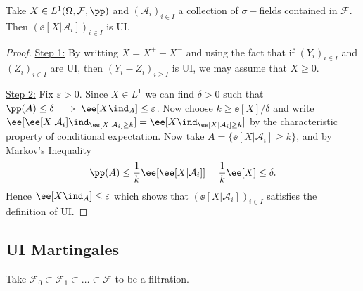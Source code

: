 \documentclass[../main.tex]{subfiles}
\begin{document}
  \begin{proposition}
    Take $X \in L^1(\Omega, \mathcal{F}, \pp)$ and $(\mathcal{A}_i)_{i \in I}$
    a collection of $\sigma-$fields contained in $\mathcal{F}$.
    Then $(\ee[X | \mathcal{A}_i])_{i \in I}$ is UI. 
  \end{proposition}
  \begin{proof}
    \underline{Step 1:} By writting $X = X^+ - X^-$ and using the fact that if
    $(Y_{i})_{i \in I}$ and $(Z_i)_{i \in I}$ are UI, then $(Y_i - Z_i)_{i \geq
    I}$ is UI, we may assume that $X \geq 0$.

    \vspace{0.3em}
    \noindent
    \underline{Step 2:}
    Fix $\varepsilon>0$. Since $X \in L^1$ we can find $\delta > 0$ such that
    $\pp(A) \leq \delta \implies \ee[X \ind_A] \leq \varepsilon$. Now choose $k
    \geq \ee[X] / \delta$ and write
    $\ee[\ee[X | \mathcal{A}_i] \ind_{\ee[X | \mathcal{A}_i] \geq k}] = \ee[X
    \ind_{\ee[X|\mathcal{A}_i] \geq k}]$ by the characteristic property of
    conditional expectation. Now take $A = \{ \ee[X | \mathcal{A}_i] \geq k\} $,
    and by Markov's Inequality
    \[
      \pp(A) \leq \frac{1}{k} \ee[\ee[X | \mathcal{A}_i]] = \frac{1}{k} \ee[X]
      \leq \delta
    .\]     
  Hence $\ee[X \ind_{A}] \leq \varepsilon$ which shows that $(\ee[X |
    \mathcal{A}_i])_{i \in I}$ satisfies the definition of UI.
  \end{proof}

  \subsection{UI Martingales}

  Take
  $\mathcal{F}_0 \subset \mathcal{F}_1 \subset \ldots \subset \mathcal{F}$ to be a
  filtration.
\end{document}
